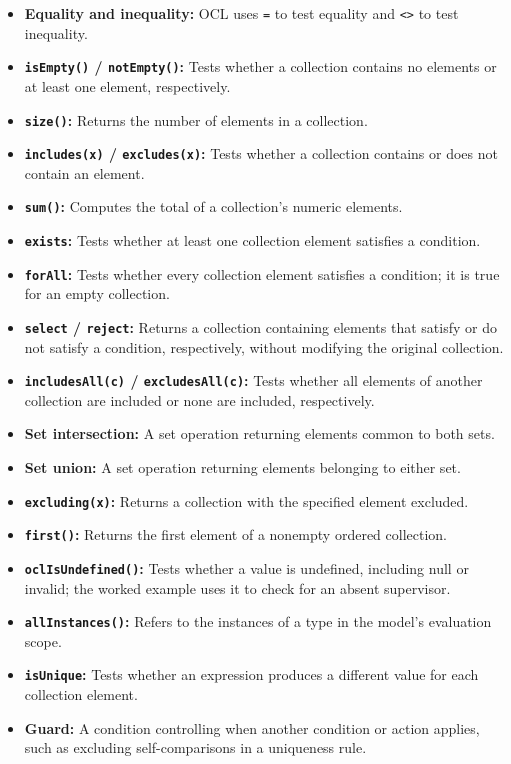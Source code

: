\documentclass[11pt]{article}
\newenvironment{DottedList}{%
  \begin{itemize}[leftmargin=2em, itemsep=0.35em, topsep=0.35em, label=\textbullet]
}{%
  \end{itemize}
}
\begin{document}
\begin{DottedList}
  \item \textbf{Equality and inequality:} OCL uses \texttt{=} to test equality and \texttt{<>} to test inequality.
  \item \textbf{\texttt{isEmpty()} / \texttt{notEmpty()}:} Tests whether a collection contains no elements or at least one element, respectively.
  \item \textbf{\texttt{size()}:} Returns the number of elements in a collection.
  \item \textbf{\texttt{includes(x)} / \texttt{excludes(x)}:} Tests whether a collection contains or does not contain an element.
  \item \textbf{\texttt{sum()}:} Computes the total of a collection's numeric elements.
  \item \textbf{\texttt{exists}:} Tests whether at least one collection element satisfies a condition.
  \item \textbf{\texttt{forAll}:} Tests whether every collection element satisfies a condition; it is true for an empty collection.
  \item \textbf{\texttt{select} / \texttt{reject}:} Returns a collection containing elements that satisfy or do not satisfy a condition, respectively, without modifying the original collection.
  \item \textbf{\texttt{includesAll(c)} / \texttt{excludesAll(c)}:} Tests whether all elements of another collection are included or none are included, respectively.
  \item \textbf{Set intersection:} A set operation returning elements common to both sets.
  \item \textbf{Set union:} A set operation returning elements belonging to either set.
  \item \textbf{\texttt{excluding(x)}:} Returns a collection with the specified element excluded.
  \item \textbf{\texttt{first()}:} Returns the first element of a nonempty ordered collection.
  \item \textbf{\texttt{oclIsUndefined()}:} Tests whether a value is undefined, including null or invalid; the worked example uses it to check for an absent supervisor.
  \item \textbf{\texttt{allInstances()}:} Refers to the instances of a type in the model's evaluation scope.
  \item \textbf{\texttt{isUnique}:} Tests whether an expression produces a different value for each collection element.
  \item \textbf{Guard:} A condition controlling when another condition or action applies, such as excluding self-comparisons in a uniqueness rule.
\end{DottedList}
\end{document}
